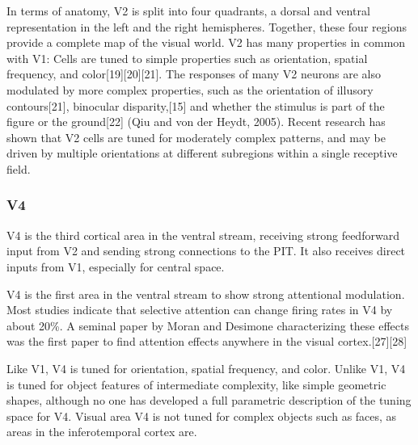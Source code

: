 In terms of anatomy, V2 is split into four quadrants, a dorsal and ventral representation in the left and the right hemispheres. 
Together, these four regions provide a complete map of the visual world.
V2 has many properties in common with V1: Cells are tuned to simple properties such as orientation, spatial frequency, and color[19][20][21].
The responses of many V2 neurons are also modulated by more complex properties, such as the orientation of illusory contours[21], binocular disparity,[15] and whether the stimulus is part of the figure or the ground[22] (Qiu and von der Heydt, 2005).
Recent research has shown that V2 cells are tuned for moderately complex patterns, and may be driven by multiple orientations at different subregions within a single receptive field.


\subsubsection{V4}
V4 is the third cortical area in the ventral stream, receiving strong feedforward input from V2 and sending strong connections to the PIT.
It also receives direct inputs from V1, especially for central space.

V4 is the first area in the ventral stream to show strong attentional modulation.
Most studies indicate that selective attention can change firing rates in V4 by about 20\%. A seminal paper by Moran and Desimone characterizing these effects was the first paper to find attention effects anywhere in the visual cortex.[27][28]

Like V1, V4 is tuned for orientation, spatial frequency, and color.
Unlike V1, V4 is tuned for object features of intermediate complexity, like simple geometric shapes, although no one has developed a full parametric description of the tuning space for V4.
Visual area V4 is not tuned for complex objects such as faces, as areas in the inferotemporal cortex are.

